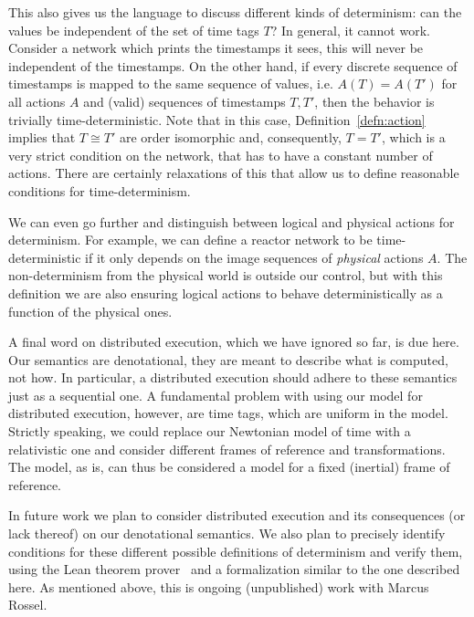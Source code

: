 This also gives us the language to discuss different kinds of determinism: can the values be independent of the set of time tags $T$?
In general, it cannot work. Consider a network which prints the timestamps it sees, this will never be independent of the timestamps.
On the other hand, if every discrete sequence of timestamps is mapped to the same sequence of values, i.e. $A(T) = A(T')$ for all actions $A$ and (valid) sequences of timestamps $T, T'$, then the behavior is trivially time-deterministic.
Note that in this case, Definition~\ref{defn:action} implies that $T \cong T'$ are order isomorphic and, consequently, $T = T'$, which is a very strict condition on the network, that has to have a constant number of actions.
There are certainly relaxations of this that allow us to define reasonable conditions for time-determinism.

We can even go further and distinguish between logical and physical actions for determinism. 
For example, we can define a reactor network to be time-deterministic if it only depends on the image sequences of \emph{physical} actions $A$.
The non-determinism from the physical world is outside our control, but with this definition we are also ensuring logical actions to behave deterministically as a function of the physical ones. 

A final word on distributed execution, which we have ignored so far, is due here. 
Our semantics are denotational, they are meant to describe what is computed, not how. 
In particular, a distributed execution should adhere to these semantics just as a sequential one.
A fundamental problem with using our model for distributed execution, however, are time tags, which are uniform in the model.
Strictly speaking, we could replace our Newtonian model of time with a relativistic one and consider different frames of reference and transformations. 
The model, as is, can thus be considered a model for a fixed (inertial) frame of reference.

In future work we plan to consider distributed execution and its consequences (or lack thereof) on our denotational semantics. 
We also plan to precisely identify conditions for these different possible definitions of determinism and verify them, using the Lean theorem prover~\cite{lean} and a formalization similar to the one described here.
As mentioned above, this is ongoing (unpublished) work with Marcus Rossel.